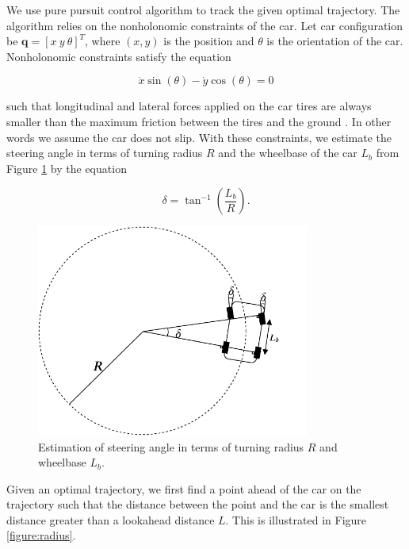 We use pure pursuit control algorithm to track the given optimal trajectory.
The algorithm relies on the nonholonomic constraints of the car. Let car
configuration be $\textbf{q} = [x\ y\ \theta]^T$, where $(x, y)$ is the
position and $\theta$ is the orientation of the car. Nonholonomic constraints
satisfy the equation

\begin{equation}
  \dot{x}\sin(\theta) - \dot{y}\cos(\theta) = 0
  \label{eq:nonholonomic}
\end{equation}

such that longitudinal and lateral forces applied on the car tires are always
smaller than the maximum friction between the tires and the ground
\cite{Kim2013SensorbasedMP}. In other words we assume the car does not slip.
With these constraints, we estimate the steering angle in terms of turning
radius $R$ and the wheelbase of the car $L_b$ from Figure \ref{figure:steering}
by the equation

\begin{equation}
  \delta = \tan^{-1}(\frac{L_b}{R}).
  \label{eq:steering}
\end{equation}

\begin{figure}[h]
  \centering
  \includegraphics[width=0.8\textwidth]{figures/pure-pursuit-steering.pdf}
  \caption[Steering angle geometry in pure pursuit controller]{Estimation of
    steering angle in terms of turning radius $R$ and wheelbase $L_b$.}
  \label{figure:steering}
\end{figure}

Given an optimal trajectory, we first find a point ahead of the car on the
trajectory such that the distance between the point and the car is the smallest
distance greater than a lookahead distance $L$. This is illustrated in Figure
\ref{figure:radius}.

